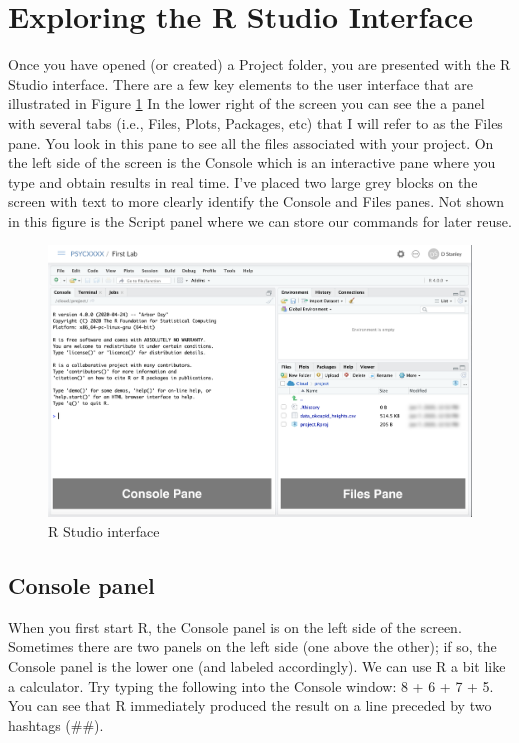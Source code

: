\documentclass[
]{krantz}
\begin{document}
\hypertarget{exploring-the-r-studio-interface}{%
\section{Exploring the R Studio Interface}\label{exploring-the-r-studio-interface}}

Once you have opened (or created) a Project folder, you are presented with the R Studio interface. There are a few key elements to the user interface that are illustrated in Figure \ref{fig:interface} In the lower right of the screen you can see the a panel with several tabs (i.e., Files, Plots, Packages, etc) that I will refer to as the Files pane. You look in this pane to see all the files associated with your project. On the left side of the screen is the Console which is an interactive pane where you type and obtain results in real time. I've placed two large grey blocks on the screen with text to more clearly identify the Console and Files panes. Not shown in this figure is the Script panel where we can store our commands for later reuse.

\begin{figure}
\includegraphics[width=0.7\linewidth]{ch_introduction/images/screenshot_interface} \caption{R Studio interface}\label{fig:interface}
\end{figure}

\hypertarget{console-panel}{%
\subsection{Console panel}\label{console-panel}}

When you first start R, the Console panel is on the left side of the screen. Sometimes there are two panels on the left side (one above the other); if so, the Console panel is the lower one (and labeled accordingly). We can use R a bit like a calculator. Try typing the following into the Console window: 8 + 6 + 7 + 5. You can see that R immediately produced the result on a line preceded by two hashtags (\#\#).
\end{document}

